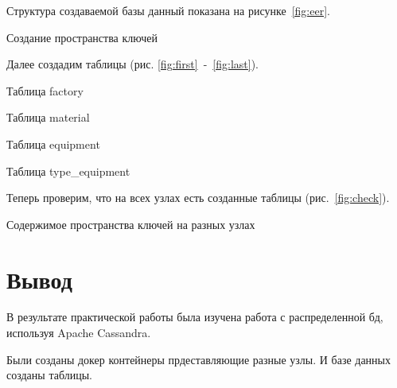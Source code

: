 Структура создаваемой базы данный показана на рисунке~\ref{fig:eer}.

\begin{image}
	\caption{Создание пространства ключей}
	\label{fig:eer}
\end{image}

Далее создадим таблицы (рис. \ref{fig:first}~-~\ref{fig:last}).

\begin{image}
	\caption{Таблица factory}
	\label{fig:first}
\end{image}

\begin{image}
	\caption{Таблица material}
\end{image}

\begin{image}
	\caption{Таблица equipment}
\end{image}

\begin{image}
	\caption{Таблица type\_equipment}
	\label{fig:last}
\end{image}

\clearpage

Теперь проверим, что на всех узлах есть созданные таблицы
(рис.~\ref{fig:check}).

\begin{image}
	\caption{Содержимое пространства ключей на разных узлах}
	\label{fig:check}
\end{image}

\clearpage

\section*{\LARGE Вывод}
В результате практической работы была изучена работа
с распределенной бд, используя Apache Cassandra.\par
Были созданы докер контейнеры прдеставляющие разные узлы.
И базе данных созданы таблицы.

